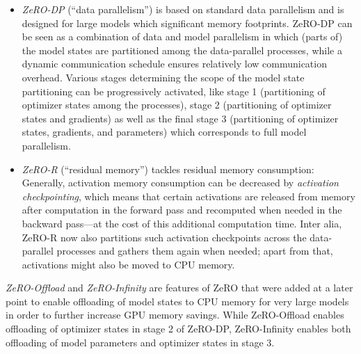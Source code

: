 \begin{itemize}
    \item \textit{ZeRO-DP} (\enquote{data parallelism}) is based on standard
          data parallelism and is designed for large models which significant
          memory footprints. ZeRO-DP can be seen as a combination of data and model
          parallelism in which (parts of) the model states are partitioned
          among the data-parallel processes, while a dynamic communication
          schedule ensures relatively low communication overhead. Various stages
          determining the scope of the model state partitioning can be progressively
          activated, like stage 1 (partitioning of optimizer states among the processes), 
          stage 2 (partitioning of optimizer states and gradients) as well as 
          the final stage 3 (partitioning of optimizer states, gradients, and 
          parameters) which corresponds to full model parallelism.
    \item \textit{ZeRO-R} (\enquote{residual memory}) tackles residual memory consumption: 
          Generally, activation memory consumption can be decreased by 
          \textit{activation checkpointing}, which means that certain activations
          are released from memory after computation in the forward pass and
          recomputed when needed in the backward pass---at the cost of this additional
          computation time. Inter alia, ZeRO-R now also partitions such activation 
          checkpoints across the data-parallel processes and gathers them again when 
          needed; apart from that, activations might also be moved to CPU memory. 
\end{itemize}

\textit{ZeRO-Offload} \cite{DBLP:journals/corr/abs-2101-06840} and 
\textit{ZeRO-Infinity} \cite{DBLP:journals/corr/abs-2104-07857} are features of ZeRO
that were added at a later point to enable offloading of model states to CPU memory 
for very large models in order to further increase GPU memory savings. While ZeRO-Offload 
enables offloading of optimizer states in stage 2 of ZeRO-DP, ZeRO-Infinity
enables both offloading of model parameters and optimizer states in stage 3.